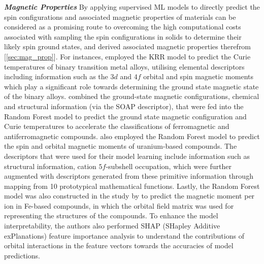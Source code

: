 \textbf{\textit{Magnetic Properties}} By applying supervised ML models to directly predict the spin configurations and associated magnetic properties of materials can be considered as a promising route to overcoming the high computational costs associated with sampling the spin configurations in solids to determine their likely spin ground states, and derived associated magnetic properties therefrom [\cref{sec:mag_prop}]. 
For instances, \citet{dam2018important} employed the KRR model to predict the Curie temperatures of binary transition metal alloys, utilising elemental descriptors including information such as the $3d$ and $4f$ orbital and spin magnetic moments which play a significant role towards determining the ground state magnetic state of the binary alloys.
\citet{long2021accelerating} combined the ground-state magnetic configurations, chemical and structural information (via the SOAP\cite{bartok2013representing} descriptor), that were fed into the Random Forest model to predict the ground state magnetic configuration and Curie temperatures to accelerate the classifications of ferromagnetic and antiferromagnetic compounds.
\citet{ghosh2020machine} also employed the Random Forest model to predict the spin and orbital magnetic moments of uranium-based compounds. The descriptors that were used for their model learning include information such as structural information, cation $5f$-subshell occupation, which were further augmented with descriptors generated from these primitive information through mapping from 10 prototypical mathematical functions.
Lastly, the Random Forest model was also constructed in the study by \citet{khatri2023magnetization} to predict the magnetic moment per ion in Fe-based compounds, in which the orbital field matrix was used for representing the structures of the compounds. To enhance the model interpretability, the authors also performed SHAP (SHapley Additive exPlanations) feature importance analysis\cite{lundberg2017unified} to understand the contributions of orbital interactions in the feature vectors towards the accuracies of model predictions.

